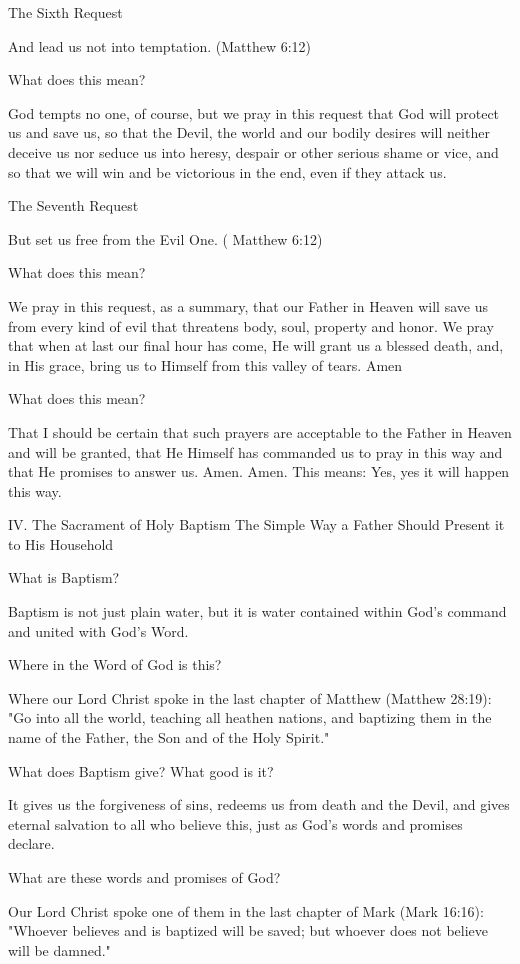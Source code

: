 The Sixth Request

And lead us not into temptation. (Matthew 6:12)

What does this mean?

God tempts no one, of course, but we pray in this request that God will
protect us and save us, so that the Devil, the world and our bodily
desires will neither deceive us nor seduce us into heresy, despair or
other serious shame or vice, and so that we will win and be victorious
in the end, even if they attack us.

The Seventh Request

But set us free from the Evil One. ( Matthew 6:12)

What does this mean?

We pray in this request, as a summary, that our Father in Heaven will
save us from every kind of evil that threatens body, soul, property and
honor. We pray that when at last our final hour has come, He will grant
us a blessed death, and, in His grace, bring us to Himself from this
valley of tears.  Amen

What does this mean?

That I should be certain that such prayers are acceptable to the Father
in Heaven and will be granted, that He Himself has commanded us to pray
in this way and that He promises to answer us. Amen. Amen. This means:
Yes, yes it will happen this way.

IV. The Sacrament of Holy Baptism
The Simple Way a Father Should Present it to His Household

What is Baptism?

Baptism is not just plain water, but it is water contained within God's
command and united with God's Word.

Where in the Word of God is this?

Where our Lord Christ spoke in the last chapter of Matthew (Matthew
28:19):
"Go into all the world, teaching all heathen nations, and baptizing
them in the name of the Father, the Son and of the Holy Spirit."

What does Baptism give? What good is it?

It gives us the forgiveness of sins, redeems us from death and the
Devil, and gives eternal salvation to all who believe this, just as
God's words and promises declare.

What are these words and promises of God?

Our Lord Christ spoke one of them in the last chapter of Mark (Mark
16:16):
"Whoever believes and is baptized will be saved; but whoever does not
believe will be damned."

